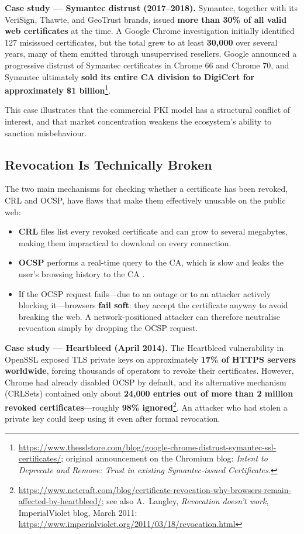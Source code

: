 \documentclass[10pt,twocolumn]{article}
\begin{document}
\textbf{Case study --- Symantec distrust (2017--2018).} Symantec, together
with its VeriSign, Thawte, and GeoTrust brands, issued \textbf{more than
30\% of all valid web certificates} at the time. A Google Chrome
investigation initially identified 127 misissued certificates, but the
total grew to at least \textbf{30{,}000} over several years, many of them
emitted through unsupervised resellers. Google announced a progressive
distrust of Symantec certificates in Chrome 66 and Chrome 70, and Symantec
ultimately \textbf{sold its entire CA division to DigiCert for approximately
\$1 billion}\footnote{\url{https://www.thesslstore.com/blog/google-chrome-distrust-symantec-ssl-certificates/}; original announcement on the Chromium blog: \textit{Intent to Deprecate and Remove: Trust in existing Symantec-issued Certificates}.}.

This case illustrates that the commercial PKI model has a structural
conflict of interest, and that market concentration weakens the ecosystem's
ability to sanction misbehaviour.

\subsection{Revocation Is Technically Broken}

The two main mechanisms for checking whether a certificate has been revoked,
CRL and OCSP, have flaws that make them effectively unusable on the public
web:

\begin{itemize}
  \item \textbf{CRL} files list every revoked certificate and can grow to
        several megabytes, making them impractical to download on every
        connection.
  \item \textbf{OCSP} performs a real-time query to the CA, which is slow
        and leaks the user's browsing history to the CA \cite{rfc6960}.
  \item If the OCSP request fails---due to an outage or to an attacker
        actively blocking it---browsers \textbf{fail soft}: they accept the
        certificate anyway to avoid breaking the web. A network-positioned
        attacker can therefore neutralise revocation simply by dropping the
        OCSP request.
\end{itemize}

\textbf{Case study --- Heartbleed (April 2014).} The Heartbleed vulnerability
in OpenSSL exposed TLS private keys on approximately \textbf{17\% of HTTPS
servers worldwide}, forcing thousands of operators to revoke their
certificates. However, Chrome had already disabled OCSP by default, and its
alternative mechanism (CRLSets) contained only about \textbf{24{,}000
entries out of more than 2 million revoked certificates}---roughly
\textbf{98\% ignored}\footnote{\url{https://www.netcraft.com/blog/certificate-revocation-why-browsers-remain-affected-by-heartbleed/}; see also A.~Langley, \textit{Revocation doesn't work}, ImperialViolet blog, March 2011: \url{https://www.imperialviolet.org/2011/03/18/revocation.html}}. An
attacker who had stolen a private key could keep using it even after formal
revocation.
\end{document}
